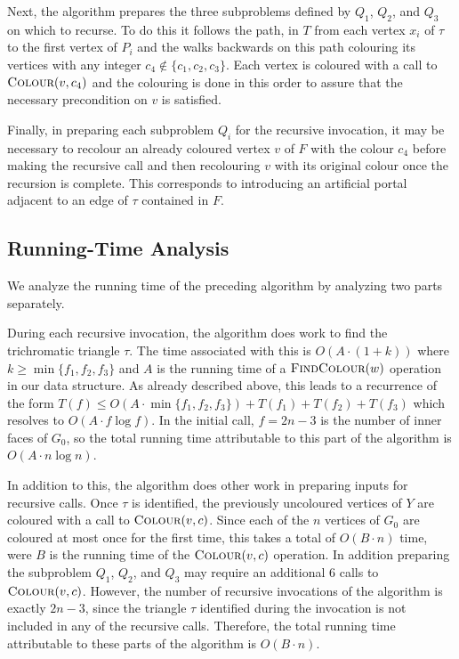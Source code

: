 \documentclass[kpfonts]{patmorin}
\let\le\leqslant
\let\ge\geqslant
\begin{document}
 Next, the algorithm prepares the three subproblems defined by $Q_1$, $Q_2$, and $Q_3$ on which to recurse.  To do this it follows the path, in $T$ from each vertex $x_i$ of $\tau$ to the first vertex of $P_i$ and the walks backwards on this path colouring its vertices with any integer $c_4\not\in\{c_1,c_2,c_3\}$.  Each vertex is coloured with a call to $\textsc{Colour}(v,c_4)$ and the colouring is done in this order to assure that the necessary precondition on $v$ is satisfied.
 
 Finally, in preparing each subproblem $Q_i$ for the recursive invocation, it may be necessary to recolour an already coloured vertex $v$ of $F$ with the colour $c_4$ before making the recursive call and then recolouring $v$ with its original colour once the recursion is complete.  This corresponds to introducing an artificial portal adjacent to an edge of $\tau$ contained in $F$.
 
 \subsection{Running-Time Analysis}
 
 We analyze the running time of the preceding algorithm by analyzing two parts separately.
 
 During each recursive invocation, the algorithm does work to find the trichromatic triangle $\tau$.  The time associated with this is $O(A\cdot(1+k))$ where $k\ge \min\{f_1,f_2,f_3\}$ and $A$ is the running time of a $\textsc{FindColour}(w)$ operation in our data structure.  As already described above, this leads to a recurrence of the form $T(f) \le O(A\cdot\min\{f_1,f_2,f_3\}) + T(f_1)+T(f_2)+T(f_3)$ which resolves to $O(A\cdot f\log f)$.  In the initial call, $f=2n-3$ is the number of inner faces of $G_0$, so the total running time attributable to this part of the algorithm is $O(A\cdot n\log n)$.
 
 In addition to this, the algorithm does other work in preparing inputs for recursive calls.  Once $\tau$ is identified, the previously uncoloured vertices of $Y$ are coloured with a call to $\textsc{Colour}(v,c)$.  Since each of the $n$ vertices of $G_0$ are coloured at most once for the first time, this takes a total of $O(B\cdot n)$ time, were $B$ is the running time of the $\textsc{Colour}(v,c)$ operation.  In addition preparing the subproblem $Q_1$, $Q_2$, and $Q_3$ may require an additional 6 calls to $\textsc{Colour}(v,c)$. However, the number of recursive invocations of the algorithm is exactly $2n-3$, since the triangle $\tau$ identified during the invocation is not included in any of the recursive calls.  Therefore, the total running time attributable to these parts of the algorithm is $O(B\cdot n)$.  
 
\end{document}
